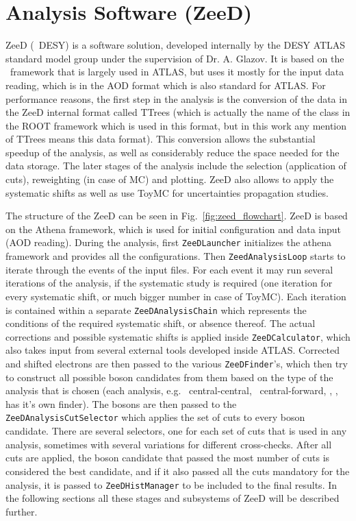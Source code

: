 \chapter{Analysis Software (ZeeD)}
\label{sec:ZeeD}
ZeeD (\Zee\ DESY) is a software solution, developed internally by the DESY ATLAS standard model group under the supervision of Dr. A. Glazov. It is based on the \Athena\ framework that is largely used in ATLAS, but uses it mostly for the input data reading, which is in the AOD format which is also standard for ATLAS. For performance reasons, the first step in the analysis is the conversion of the data in the ZeeD internal format called TTrees (which is actually the name of the class in the ROOT framework which is used in this format, but in this work any mention of TTrees means this data format). This conversion allows the substantial speedup of the analysis, as well as considerably reduce the space needed for the data storage. The later stages of the analysis include the selection (application of cuts), reweighting (in case of MC) and plotting. ZeeD also allows to apply the systematic shifts as well as use ToyMC for uncertainties propagation studies.

The structure of the ZeeD can be seen in Fig.~\ref{fig:zeed_flowchart}. ZeeD is based on the Athena framework, which is used for initial configuration and data input (AOD reading). During the analysis, first \texttt{ZeeDLauncher} initializes the athena framework and provides all the configurations. Then \texttt{ZeedAnalysisLoop} starts to iterate through the events of the input files. For each event it may run several iterations of the analysis, if the systematic study is required (one iteration for every systematic shift, or much bigger number in case of ToyMC). Each iteration is contained within a separate \texttt{ZeeDAnalysisChain} which represents the conditions of the required systematic shift, or absence thereof. The actual corrections and possible systematic shifts is applied inside \texttt{ZeeDCalculator}, which also takes input from several external tools developed inside ATLAS. Corrected and shifted electrons are then passed to the various \texttt{ZeeDFinder}'s, which then try to construct all possible boson candidates from them based on the type of the analysis that is chosen (each analysis, e.g. \Zee\ central-central, \Zee\ central-forward, \Zmm, \Wenu, has it's own finder). The bosons are then passed to the \texttt{ZeeDAnalysisCutSelector} which applies the set of cuts to every boson candidate. There are several selectors, one for each set of cuts that is used in any analysis, sometimes with several variations for different cross-checks. After all cuts are applied, the boson candidate that passed the most number of cuts is considered the best candidate, and if it also passed all the cuts mandatory for the analysis, it is passed to \texttt{ZeeDHistManager} to be included to the final results. In the following sections all these stages and subsystems of ZeeD will be described further.

